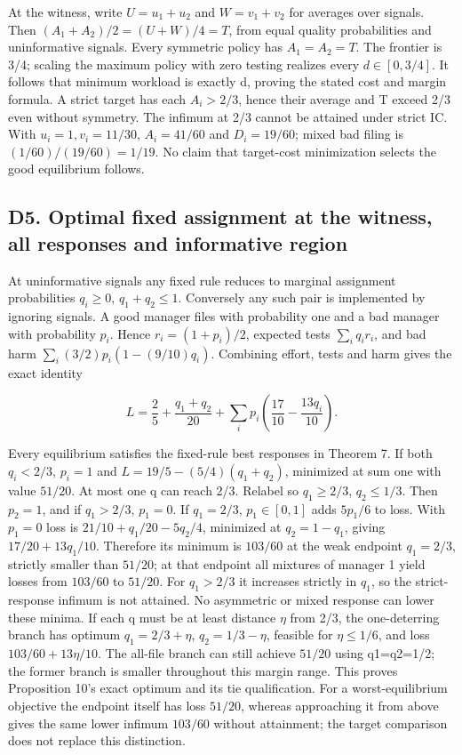 \documentclass[
  11pt,
]{article}
\begin{document}
At the witness, write \(U=u_1+u_2\) and \(W=v_1+v_2\) for averages over
signals. Then \((A_1+A_2)/2=(U+W)/4=T\), from equal quality
probabilities and uninformative signals. Every symmetric policy has
\(A_1=A_2=T\). The frontier is 3/4; scaling the maximum policy with zero
testing realizes every \(d\in[0,3/4]\). It follows that minimum workload
is exactly d, proving the stated cost and margin formula. A strict
target has each \(A_i>2/3\), hence their average and T exceed 2/3 even
without symmetry. The infimum at 2/3 cannot be attained under strict IC.
With \(u_i=1,v_i=11/30\), \(A_i=41/60\) and \(D_i=19/60\); mixed bad
filing is \((1/60)/(19/60)=1/19\). No claim that target-cost
minimization selects the good equilibrium follows.

\subsection{D5. Optimal fixed assignment at the witness, all responses
and informative
region}\label{d5.-optimal-fixed-assignment-at-the-witness-all-responses-and-informative-region}

At uninformative signals any fixed rule reduces to marginal assignment
probabilities \(q_i\geq0\), \(q_1+q_2\leq1\). Conversely any such pair
is implemented by ignoring signals. A good manager files with
probability one and a bad manager with probability \(p_i\). Hence
\(r_i=(1+p_i)/2\), expected tests \(\sum_i q_i r_i\), and bad harm
\(\sum_i(3/2)p_i(1-(9/10)q_i)\). Combining effort, tests and harm gives
the exact identity

\[L=\frac25+\frac{q_1+q_2}{20}
 +\sum_i p_i\left(\frac{17}{10}-\frac{13q_i}{10}\right).\]

Every equilibrium satisfies the fixed-rule best responses in Theorem 7.
If both \(q_i<2/3\), \(p_i=1\) and \(L=19/5-(5/4)(q_1+q_2)\), minimized
at sum one with value \(51/20\). At most one q can reach 2/3. Relabel so
\(q_1\geq2/3\), \(q_2\leq1/3\). Then \(p_2=1\), and if \(q_1>2/3\),
\(p_1=0\). If \(q_1=2/3\), \(p_1\in[0,1]\) adds \(5p_1/6\) to loss. With
\(p_1=0\) loss is \(21/10+q_1/20-5q_2/4\), minimized at \(q_2=1-q_1\),
giving \(17/20+13q_1/10\). Therefore its minimum is \(103/60\) at the
weak endpoint \(q_1=2/3\), strictly smaller than \(51/20\); at that
endpoint all mixtures of manager 1 yield losses from \(103/60\) to
\(51/20\). For \(q_1>2/3\) it increases strictly in \(q_1\), so the
strict-response infimum is not attained. No asymmetric or mixed response
can lower these minima. If each q must be at least distance \(\eta\)
from 2/3, the one-deterring branch has optimum \(q_1=2/3+\eta\),
\(q_2=1/3-\eta\), feasible for \(\eta\leq1/6\), and loss
\(103/60+13\eta/10\). The all-file branch can still achieve \(51/20\)
using q1=q2=1/2; the former branch is smaller throughout this margin
range. This proves Proposition 10's exact optimum and its tie
qualification. For a worst-equilibrium objective the endpoint itself has
loss \(51/20\), whereas approaching it from above gives the same lower
infimum \(103/60\) without attainment; the target comparison does not
replace this distinction.
\end{document}

